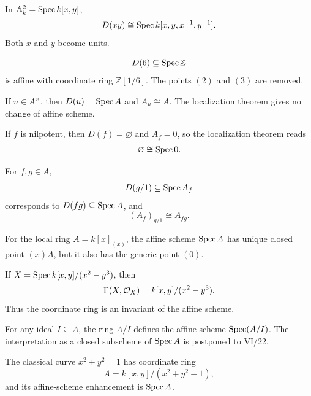 \begin{example}
In $\mathbb A^2_k=\operatorname{Spec} k[x,y]$,
\[
D(xy)\cong\operatorname{Spec} k[x,y,x^{-1},y^{-1}].
\]
Both $x$ and $y$ become units.
\end{example}

\begin{example}
\[
D(6)\subseteq\operatorname{Spec}\mathbb Z
\]
is affine with coordinate ring $\mathbb Z[1/6]$.  The points $(2)$ and $(3)$ are removed.
\end{example}

\begin{example}
If $u\in A^\times$, then $D(u)=\operatorname{Spec} A$ and $A_u\cong A$.  The localization theorem gives
no change of affine scheme.
\end{example}

\begin{example}
If $f$ is nilpotent, then $D(f)=\varnothing$ and $A_f=0$, so the localization theorem reads
\[
\varnothing\cong\operatorname{Spec} 0.
\]
\end{example}

\begin{example}
For $f,g\in A$,
\[
D(g/1)\subseteq\operatorname{Spec} A_f
\]
corresponds to $D(fg)\subseteq\operatorname{Spec} A$, and
\[
(A_f)_{g/1}\cong A_{fg}.
\]
\end{example}

\begin{example}
For the local ring $A=k[x]_{(x)}$, the affine scheme $\operatorname{Spec} A$ has unique closed point
$(x)A$, but it also has the generic point $(0)$.
\end{example}

\begin{example}
If $X=\operatorname{Spec} k[x,y]/(x^2-y^3)$, then
\[
\Gamma(X,\mathcal O_X)=k[x,y]/(x^2-y^3).
\]
Thus the coordinate ring is an invariant of the affine scheme.
\end{example}

\begin{example}
For any ideal $I\subseteq A$, the ring $A/I$ defines the affine scheme $\operatorname{Spec}(A/I)$.
The interpretation as a closed subscheme of $\operatorname{Spec} A$ is postponed to VI/22.
\end{example}

\begin{example}
The classical curve $x^2+y^2=1$ has coordinate ring
\[
A=k[x,y]/(x^2+y^2-1),
\]
and its affine-scheme enhancement is $\operatorname{Spec} A$.
\end{example}

